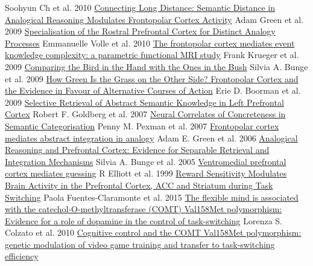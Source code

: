 \documentclass[11pt,a4paper]{article}
\begin{document}
\begin{thebibliography}{9}
  Soohyun Ch et al. 2010
  \href{http://cercor.oxfordjournals.org/content/20/1/70.short}{Connecting Long Distance: Semantic Distance in Analogical Reasoning Modulates Frontopolar Cortex Activity}
  Adam Green et al. 2009
  \href{http://cercor.oxfordjournals.org/content/20/11/2647.abstract}{Specialisation of the Rostral Prefrontal Cortex for Distinct Analogy Processes}
  Emmanuelle Volle et al. 2010
  \href{http://www.ncbi.nlm.nih.gov/pmc/articles/PMC2764527/pdf/nihms-130865.pdf}{The frontopolar cortex mediates event knowledge complexity: a parametric functional MRI study}
  Frank Krueger et al. 2009
  \href{http://www.sciencedirect.com/science/article/pii/S089662730900395X}{Comparing the Bird in the Hand with the Ones in the Bush}
  Silvia A. Bunge et al. 2009
  \href{http://www.sciencedirect.com/science/article/pii/S0896627309003894}{How Green Is the Grass on the Other Side? Frontopolar Cortex and the Evidence in Favour of Alternative Courses of Action}
  Erie D. Boorman et al. 2009
  \href{http://www.jneurosci.org/content/27/14/3790.short}{Selective Retrieval of Abstract Semantic Knowledge in Left Prefrontal Cortex}
  Robert F. Goldberg et al. 2007
  \href{http://www.mitpressjournals.org/doi/abs/10.1162/jocn.2007.19.8.1407}{Neural Correlates of Concreteness in Semantic Categorisation}
  Penny M. Pexman et al. 2007
  \href{http://www.sciencedirect.com/science/article/pii/S0006899306010274}{Frontopolar cortex mediates abstract integration in analogy}
  Adam E. Green et al. 2006
  \href{http://cercor.oxfordjournals.org/content/15/3/239}{Analogical Reasoning and Prefrontal Cortex: Evidence for Separable Retrieval and Integration Mechanisms}
  Silvia A. Bunge et al. 2005
  \href{http://www.sciencedirect.com/science/article/pii/S0028393298001079}{Ventromedial prefrontal cortex mediates guessing}
  R Elliott et al. 1999
  \href{http://www.ncbi.nlm.nih.gov/pmc/articles/PMC4395363/}{Reward Sensitivity Modulates Brain Activity in the Prefrontal Cortex, ACC and Striatum during Task Switching}
  Paola Fuentes-Claramonte et al. 2015
  \href{http://www.sciencedirect.com/science/article/pii/S0028393210001697}{The flexible mind is associated with the catechol-O-methyltransferase (COMT) Val158Met polymorphism: Evidence for a role of dopamine in the control of task-switching}
  Lorenza S. Colzato et al. 2010
  \href{http://link.springer.com/article/10.1007/s00426-013-0514-8}{Cognitive control and the COMT Val158Met polymorphism: genetic modulation of video game training and transfer to task-switching efficiency}

\end{thebibliography}
\end{document}
